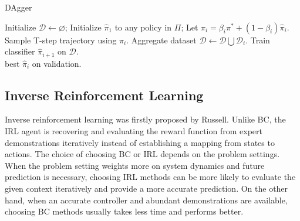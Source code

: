 \documentclass[acmsmall]{acmart}
\begin{document}
\begin{algorithm}[t]
  \caption{DAgger \protect\cite{rossReductionImitationLearning2011}}
  \label{alg:dagger}
  \begin{algorithmic}[1]
    \State Initialize $\mathcal{D} \leftarrow \varnothing$; 
    \State Initialize $\hat{\pi}_{1}$ to any policy in $\Pi$;
        \State Let $\pi_{i} = \beta_{i}\pi^{*} + (1-\beta_{i})\hat{\pi}_{i}$.
        \State Sample T-step trajectory using $\pi_i$.
        \State {}
        \State Aggregate dataset $\mathcal{D} \leftarrow \mathcal{D}\bigcup\mathcal{D}_i$.
        \State Train classifier $\hat{\pi}_{i+1}$ on $\mathcal{D}$.
    \EndFor\\
    \Return best $\hat{\pi}_{i}$ on validation.
  \end{algorithmic}
\end{algorithm}


\subsection{Inverse Reinforcement Learning}
Inverse reinforcement learning was firstly proposed by Russell\cite{russelllearning1998}. Unlike BC, the IRL agent is recovering and evaluating the reward function from expert demonstrations iteratively instead of establishing a mapping from states to actions. The choice of choosing BC or IRL depends on the problem settings. When the problem setting weights more on system dynamics and future prediction is necessary, choosing IRL methods can be more likely to evaluate the given context iteratively and provide a more accurate prediction. On the other hand, when an accurate controller and abundant demonstrations are available, choosing BC methods usually takes less time and performs better.   
\end{document}
